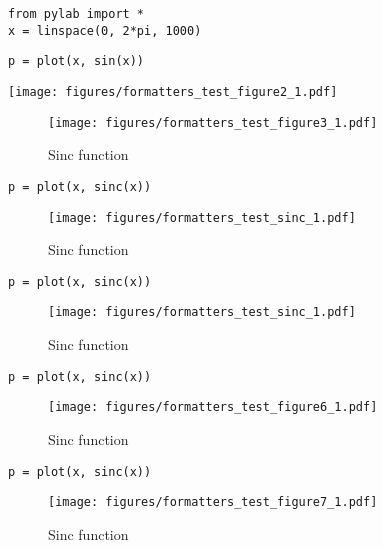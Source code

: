 

\begin{verbatim}
from pylab import *
x = linspace(0, 2*pi, 1000)
\end{verbatim}



\begin{verbatim}
p = plot(x, sin(x))
\end{verbatim}
\texttt{[image: figures/formatters\_test\_figure2\_1.pdf]}



\begin{figure}[htpb]
\center
\texttt{[image: figures/formatters\_test\_figure3\_1.pdf]}
\caption{Sinc function}
\label{fig:None}
\end{figure}



\begin{verbatim}
p = plot(x, sinc(x))
\end{verbatim}
\begin{figure}[htpb]
\center
\texttt{[image: figures/formatters\_test\_sinc\_1.pdf]}
\caption{Sinc function}
\label{fig:sinc}
\end{figure}



\begin{verbatim}
p = plot(x, sinc(x))
\end{verbatim}
\begin{figure}[htpb]
\center
\texttt{[image: figures/formatters\_test\_sinc\_1.pdf]}
\caption{Sinc function}
\label{fig:sinc}
\end{figure}



\begin{verbatim}
p = plot(x, sinc(x))
\end{verbatim}
\begin{figure}[htpb]
\center
\texttt{[image: figures/formatters\_test\_figure6\_1.pdf]}
\caption{Sinc function}
\label{fig:None}
\end{figure}



\begin{verbatim}
p = plot(x, sinc(x))
\end{verbatim}
\begin{sidefigure}
\begin{figure}[htpb]
\center
\texttt{[image: figures/formatters\_test\_figure7\_1.pdf]}
\caption{Sinc function}
\label{fig:None}
\end{figure}
\end{sidefigure}



